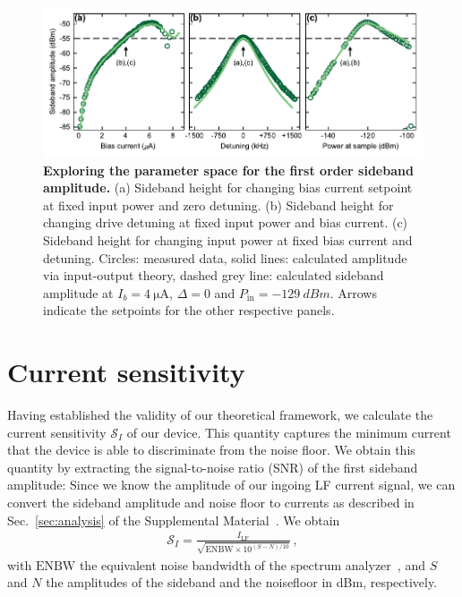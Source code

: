 \begin{figure}[]
	\centering
	\includegraphics[width=\linewidth]{chapter-currentdetection/figures/Figure3}
	\caption{
		\textbf{Exploring the parameter space for the first order sideband amplitude.}
		(a) Sideband height for changing bias current setpoint at fixed input power and zero detuning. %
		(b) Sideband height for changing drive detuning at fixed input power and bias current.
		(c) Sideband height for changing input power at fixed bias current and detuning. %
		Circles: measured data, solid lines: calculated amplitude via input-output theory, dashed grey line: calculated sideband amplitude at $I_b=\SI{4}{\micro\ampere}$, $\Delta=0$ and $P_\text{in}=\SI{-129}{dBm}$.
		Arrows indicate the setpoints for the other respective panels.
		\label{fig:figure3}
	}
\end{figure}

\section{Current sensitivity}

Having established the validity of our theoretical framework, we calculate the current sensitivity $\mathcal{S}_I$ of our device.
% 
This quantity captures the minimum current that the device is able to discriminate from the noise floor.
% 
We obtain this quantity by extracting the signal-to-noise ratio (SNR) of the first sideband amplitude:
% 
Since we know the amplitude of our ingoing LF current signal, we can convert the sideband amplitude and noise floor to currents as described in Sec.~\ref{sec:analysis} of the Supplemental Material~\cite{SeeSupplementalMaterial}.
% 
We obtain
% 
\begin{align}
\mathcal{S}_I = \frac{I_\text{LF}}{\sqrt{\text{ENBW}\times10^{(S-N)/10}}}\ ,
\label{eq:sensitivity}
\end{align}
% 
with $\text{ENBW}$ the equivalent noise bandwidth of the spectrum analyzer~\cite{rauscherFundamentalsSpectrumAnalysis2016a}, and $S$ and $N$ the amplitudes of the sideband and the noisefloor in \si{dBm}, respectively.


